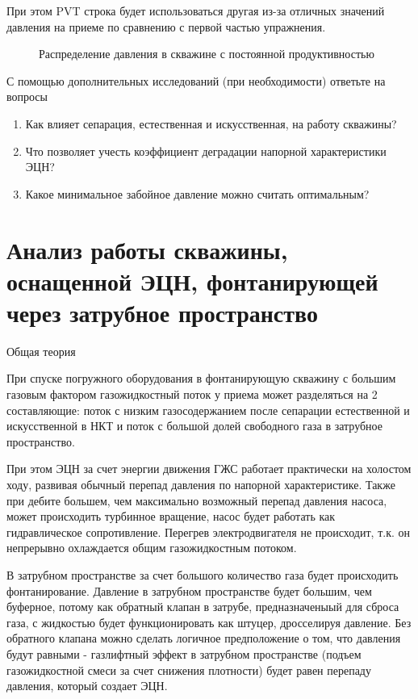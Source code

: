 При этом PVT строка будет использоваться другая из-за отличных значений давления на приеме по сравнению с первой частью упражнения.

\begin{figure}[h!]
	\center{\texttt{[image: Ex100\_3]}}
	\caption{Распределение давления в скважине с постоянной продуктивностью}
	\label{ris:Ex100_3}
\end{figure}

С помощью дополнительных исследований (при необходимости) ответьте на вопросы

\begin{enumerate}
	\item Как влияет сепарация, естественная и искусственная, на работу скважины?
	\item Что позволяет учесть коэффициент деградации напорной характеристики ЭЦН?
	\item Какое минимальное забойное давление можно считать оптимальным?
\end{enumerate}


\section{Анализ работы скважины, оснащенной ЭЦН, фонтанирующей через затрубное пространство}

Общая теория 

При спуске погружного оборудования в фонтанирующую скважину с большим газовым фактором газожидкостный поток у приема может разделяться на 2 составляющие: поток с низким газосодержанием после сепарации естественной и искусственной в НКТ и поток с большой долей свободного газа в затрубное пространство. 

При этом ЭЦН за счет энергии движения ГЖС работает практически на холостом ходу, развивая обычный перепад давления по напорной характеристике. Также при дебите большем, чем максимально возможный перепад давления  насоса, может происходить турбинное вращение, насос будет работать как гидравлическое сопротивление. Перегрев электродвигателя не происходит, т.к. он непрерывно охлаждается общим газожидкостным потоком.

В затрубном пространстве за счет большого количество газа будет происходить фонтанирование. Давление в затрубном пространстве будет большим, чем буферное, потому как обратный клапан в затрубе, предназначеныый для сброса газа, с жидкостью будет функционировать как штуцер, дросселируя давление. Без обратного клапана можно сделать  логичное предположение о том, что давления будут равными - газлифтный эффект в затрубном пространстве (подъем газожидкостной смеси за счет снижения плотности) будет равен перепаду давления, который создает ЭЦН.

